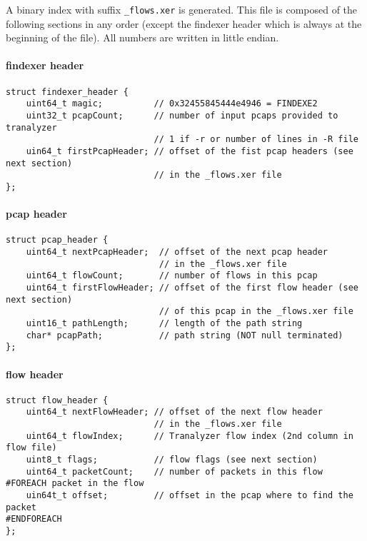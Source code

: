 \documentclass[documentation]{subfiles}
\begin{document}
A binary index with suffix {\tt \_flows.xer} is generated. This file is composed of the following
sections in any order (except the findexer header which is always at the beginning of the file).
All numbers are written in little endian.

\paragraph{findexer header}
\begin{verbatim}
struct findexer_header {
    uint64_t magic;          // 0x32455845444e4946 = FINDEXE2
    uint32_t pcapCount;      // number of input pcaps provided to tranalyzer
                             // 1 if -r or number of lines in -R file
    uin64_t firstPcapHeader; // offset of the fist pcap headers (see next section)
                             // in the _flows.xer file
};
\end{verbatim}

\paragraph{pcap header}
\begin{verbatim}
struct pcap_header {
    uint64_t nextPcapHeader;  // offset of the next pcap header
                              // in the _flows.xer file
    uint64_t flowCount;       // number of flows in this pcap
    uint64_t firstFlowHeader; // offset of the first flow header (see next section)
                              // of this pcap in the _flows.xer file
    uint16_t pathLength;      // length of the path string
    char* pcapPath;           // path string (NOT null terminated)
};
\end{verbatim}

\paragraph{flow header}
\begin{verbatim}
struct flow_header {
    uint64_t nextFlowHeader; // offset of the next flow header
                             // in the _flows.xer file
    uint64_t flowIndex;      // Tranalyzer flow index (2nd column in flow file)
    uint8_t flags;           // flow flags (see next section)
    uint64_t packetCount;    // number of packets in this flow
#FOREACH packet in the flow
    uin64t_t offset;         // offset in the pcap where to find the packet
#ENDFOREACH
};
\end{verbatim}
\end{document}
